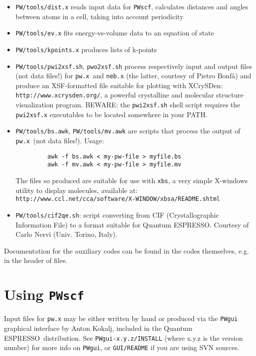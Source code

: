 \documentclass[12pt,a4paper]{article}
\def\PWscf{\texttt{PWscf}}
\def\qe{{\sc Quantum ESPRESSO}}
\def\pwx{\texttt{pw.x}}
\begin{document}
\begin{itemize}
\item  \texttt{PW/tools/dist.x} reads input data for \PWscf,
calculates distances and angles between atoms in a cell,
taking into account periodicity 
\item  \texttt{PW/tools/ev.x} fits energy-vs-volume data to an equation of state
\item  \texttt{PW/tools/kpoints.x} produces lists of k-points
\item  \texttt{PW/tools/pwi2xsf.sh},  \texttt{pwo2xsf.sh} process respectively 
  input and output files (not data files!) for \pwx\ and \texttt{neb.x} 
  (the latter, courtesy of Pietro Bonf\`a) and produce an XSF-formatted file
  suitable for plotting with XCrySDen:
  \texttt{http://www.xcrysden.org/}, a powerful crystalline and
  molecular structure visualization program.
  BEWARE: the  \texttt{pwi2xsf.sh} shell script requires the
  \texttt{pwi2xsf.x} executables to be located somewhere in your PATH. 
\item  \texttt{PW/tools/bs.awk},  \texttt{PW/tools/mv.awk} are scripts that process the output of \pwx\ (not
data files!). Usage: 
\begin{verbatim}
         awk -f bs.awk < my-pw-file > myfile.bs
         awk -f mv.awk < my-pw-file > myfile.mv
\end{verbatim}
The files so produced are suitable for use with  \texttt{xbs}, a very simple
X-windows utility to display molecules, available at:\\
 \texttt{http://www.ccl.net/cca/software/X-WINDOW/xbsa/README.shtml}
\item  \texttt{PW/tools/cif2qe.sh}: script converting from CIF 
(Crystallographic Information File) to a format suitable for \qe.
Courtesy of Carlo Nervi (Univ. Torino, Italy).
\end{itemize}
Documentation for the auxiliary codes can be found in the codes
themselves, e.g. in the header of files.

\newpage\section{Using \PWscf}

Input files for \texttt{pw.x} may be either written by hand 
or produced via the \texttt{PWgui} graphical interface by Anton Kokalj, 
included in the \qe\ distribution. See \texttt{PWgui-x.y.z/INSTALL}
(where x.y.z is the version number) for more info on \texttt{PWgui}, 
or \texttt{GUI/README} if you are using SVN sources.
    
\end{document}
